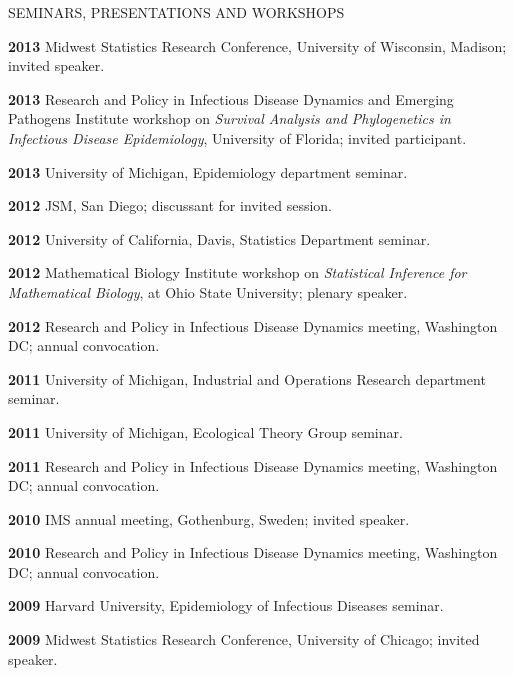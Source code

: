 \begin{mylist}{SEMINARS, PRESENTATIONS AND WORKSHOPS}
\item{\bf 2013 } Midwest Statistics Research Conference, University of Wisconsin, Madison;  invited speaker.

\item{\bf 2013 }  Research and Policy in Infectious Disease Dynamics and Emerging Pathogens Institute workshop on {\it Survival Analysis and Phylogenetics in Infectious Disease Epidemiology}, University of Florida; invited participant.

\item{\bf 2013 } University of Michigan, Epidemiology department seminar.

\item{\bf 2012 } JSM, San Diego; discussant for invited session.

\item{\bf 2012 } University of California, Davis, Statistics Department seminar.

\item{\bf 2012 } Mathematical Biology Institute workshop on {\it Statistical Inference for Mathematical Biology}, at Ohio State University; plenary speaker.

\item{\bf 2012 } Research and Policy in Infectious Disease Dynamics meeting, Washington DC; annual convocation.

\item{\bf 2011 } University of Michigan, Industrial and Operations Research department seminar.

\item{\bf 2011 } University of Michigan, Ecological Theory Group seminar.

\item{\bf 2011 } Research and Policy in Infectious Disease Dynamics meeting, Washington DC; annual convocation.

\item{\bf 2010 } IMS annual meeting, Gothenburg, Sweden; invited speaker.

\item{\bf 2010 } Research and Policy in Infectious Disease Dynamics meeting, Washington DC; annual convocation.

\item{\bf 2009 } Harvard University, Epidemiology of Infectious Diseases seminar.

\item{\bf 2009 } Midwest Statistics Research Conference, University of Chicago;  invited speaker.


\end{mylist}
